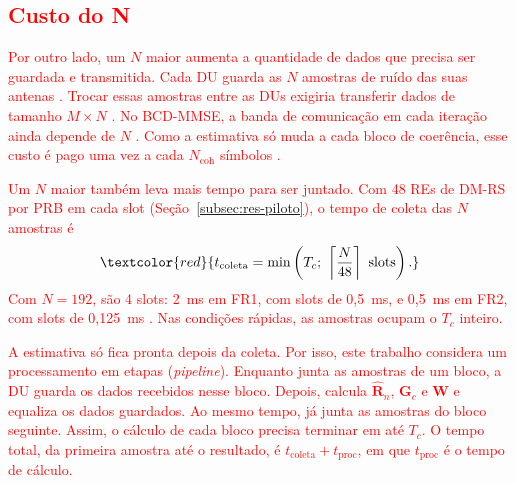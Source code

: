 \subsection{\texorpdfstring{\textcolor{red}{Custo do N}}{Custo do N}}

\textcolor{red}{Por outro lado, um $N$ maior aumenta a quantidade de dados que precisa ser guardada e transmitida. Cada DU guarda as $N$ amostras de ruído das suas antenas \cite{zhao2025jsac}. Trocar essas amostras entre as DUs exigiria transferir dados de tamanho $M \times N$ \cite{zhao2025jsac}. No BCD-MMSE, a banda de comunicação em cada iteração ainda depende de $N$ \cite{zhao2025jsac}. Como a estimativa só muda a cada bloco de coerência, esse custo é pago uma vez a cada $N_{\text{coh}}$ símbolos \cite{zhao2025jsac}.}

\textcolor{red}{Um $N$ maior também leva mais tempo para ser juntado. Com 48 REs de DM-RS por PRB em cada slot (Seção~{\hypersetup{linkcolor=red}\ref{subsec:res-piloto}}), o tempo de coleta das $N$ amostras é}
\begin{equation*}
\textcolor{red}{t_{\text{coleta}} = \min\left(T_c;\ \left\lceil \frac{N}{48} \right\rceil \text{ slots}\right).}
\end{equation*}
\textcolor{red}{Com $N = 192$, são 4 slots: 2~ms em FR1, com slots de 0,5~ms, e 0,5~ms em FR2, com slots de 0,125~ms \cite[Tab.~4.3.2-1]{3gpp-ts38211}. Nas condições rápidas, as amostras ocupam o $T_c$ inteiro.}

\textcolor{red}{A estimativa só fica pronta depois da coleta. Por isso, este trabalho considera um processamento em etapas (\textit{pipeline}). Enquanto junta as amostras de um bloco, a DU guarda os dados recebidos nesse bloco. Depois, calcula $\hat{\mathbf{R}}_n$, $\mathbf{G}_c$ e $\mathbf{W}$ e equaliza os dados guardados. Ao mesmo tempo, já junta as amostras do bloco seguinte. Assim, o cálculo de cada bloco precisa terminar em até $T_c$. O tempo total, da primeira amostra até o resultado, é $t_{\text{coleta}} + t_{\text{proc}}$, em que $t_{\text{proc}}$ é o tempo de cálculo.}

